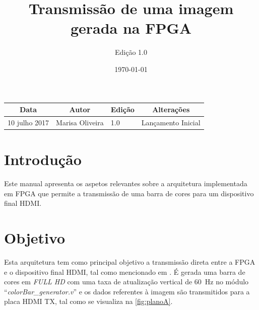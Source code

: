 \documentclass[11pt,a4paper]{article}
\title{Transmissão de uma imagem gerada na FPGA} %
\author{Edição 1.0}
\date{\today} %
\begin{document}
	
	\maketitle %
	
	\begin{table}[h!]
		\centering
		\label{my-label}
		\begin{tabular}{@{}llll@{}}
			\toprule
			\multicolumn{1}{c}{\textbf{Data}} & \multicolumn{1}{c}{\textbf{Autor}} & \multicolumn{1}{c}{\textbf{Edição}} & \multicolumn{1}{c}{\textbf{Alterações}} \\ \midrule
			10 julho 2017                     & Marisa Oliveira                    & 1.0                                 & Lançamento Inicial                       \\ \bottomrule
		\end{tabular}
	\end{table}
	
	
	
	\section{Introdução}
	
	Este manual apresenta os aspetos relevantes sobre a arquitetura implementada em FPGA que permite a transmissão de uma barra de cores para um dispositivo final HDMI.
	
	\section{Objetivo}
	
	Esta arquitetura tem como principal objetivo a transmissão direta entre a FPGA e o dispositivo final HDMI, tal como mencionado em \cite{R041}. É gerada uma barra de cores em \textit{FULL HD} com uma taxa de atualização vertical de \SI{60}{\hertz} no módulo ``\textit{colorBar\_generator.v}'' e os dados referentes à imagem são transmitidos para a placa HDMI TX, tal como se visualiza na \cref{fig:planoA}.
\end{document}
